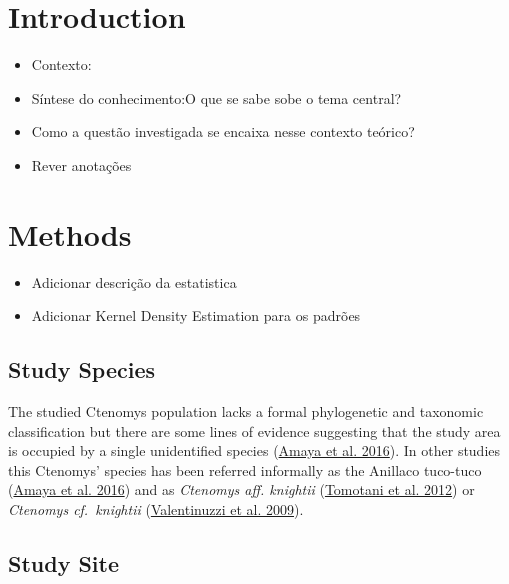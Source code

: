 \documentclass[english,msc,numbers,hidelinks]{coppe}
\providecommand{\tightlist}{%
  \setlength{\itemsep}{0pt}\setlength{\parskip}{0pt}}
\begin{document}
  \hypertarget{introduction}{%
  \section{Introduction}\label{introduction}}
  \begin{itemize}
  \tightlist
  \item
    Contexto:
  \item
    Síntese do conhecimento:O que se sabe sobe o tema central?
  \item
    Como a questão investigada se encaixa nesse contexto teórico?
  \item
    Rever anotações
  \end{itemize}
  \hypertarget{methods}{%
  \section{Methods}\label{methods}}
  \begin{itemize}
  \tightlist
  \item
    Adicionar descrição da estatistica
  \item
    Adicionar Kernel Density Estimation para os padrões
  \end{itemize}
  \hypertarget{study-species}{%
  \subsection{Study Species}\label{study-species}}

  The studied Ctenomys population lacks a formal phylogenetic and taxonomic classification but there are some lines of evidence suggesting that the study area is occupied by a single unidentified species (\protect\hyperlink{ref-amaya2016}{Amaya et al. 2016}). In other studies this Ctenomys' species has been referred informally as the Anillaco tuco-tuco (\protect\hyperlink{ref-amaya2016}{Amaya et al. 2016}) and as \emph{Ctenomys aff. knightii} (\protect\hyperlink{ref-tomotani2012}{Tomotani et al. 2012}) or \emph{Ctenomys cf.~knightii} (\protect\hyperlink{ref-valentinuzzi2009}{Valentinuzzi et al. 2009}).

  \hypertarget{study-site}{%
  \subsection{Study Site}\label{study-site}}
\end{document}
